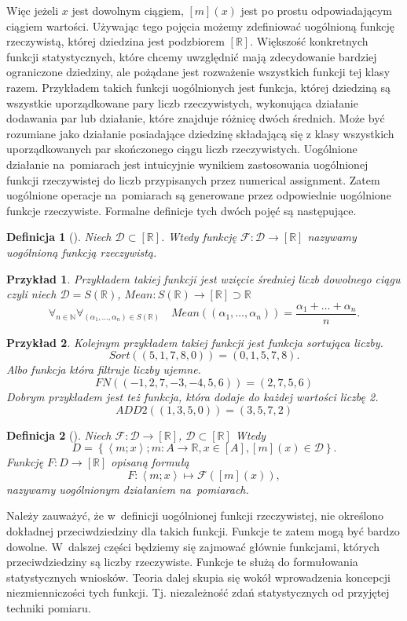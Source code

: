 \documentclass[12pt,a4paper]{report}
\newtheorem{definition}{Definicja}[chapter]
\newtheorem{przyklad}{Przykład}
\newcommand{\parauporzadkowana}[2]{\left\langle {#1}; {#2} \right\rangle}
\newcommand{\zbior}[1]{\left\lbrace {#1} \right\rbrace }
\newcommand{\domkniecie}[1]{\left[ {#1} \right] }
\begin{document}
Więc jeżeli $x$ jest dowolnym ciągiem, $\domkniecie{m}(x)$ jest po prostu odpowiadającym ciągiem wartości. Używając tego pojęcia możemy zdefiniować uogólnioną funkcję rzeczywistą, której dziedzina jest podzbiorem $\domkniecie{\mathbb{R}}$. Większość konkretnych funkcji statystycznych, które chcemy uwzględnić mają zdecydowanie bardziej ograniczone dziedziny, ale pożądane jest rozważenie wszystkich funkcji tej klasy razem. Przykładem takich funkcji uogólnionych jest funkcja, której dziedziną są wszystkie uporządkowane pary liczb rzeczywistych, wykonująca działanie dodawania par lub działanie, które znajduje różnicę dwóch średnich. Może być rozumiane jako działanie posiadające dziedzinę składającą się z klasy wszystkich uporządkowanych par skończonego ciągu liczb rzeczywistych. Uogólnione działanie na~pomiarach jest intuicyjnie wynikiem zastosowania uogólnionej funkcji rzeczywistej  do liczb przypisanych przez numerical assignment. Zatem uogólnione operacje na~pomiarach są generowane przez odpowiednie uogólnione funkcje rzeczywiste. Formalne definicje tych dwóch pojęć są następujące.
\begin{definition}[{\citep[Def. 4.1]{adams1965theory}}]
Niech $\mathcal{D}\subset \domkniecie{\mathbb{R}}$. Wtedy funkcję $\mathcal{F}:\mathcal{D}\to \domkniecie{\mathbb{R}}$ nazywamy uogólnioną funkcją rzeczywistą.
\end{definition}
\begin{przyklad}
Przykładem takiej funkcji jest wzięcie średniej  liczb dowolnego ciągu czyli niech $\mathcal{D}=S(\mathbb{R})$, $Mean: S(\mathbb{R})\to \domkniecie{\mathbb{R}}\supset \mathbb{R}$
$$
\forall_{n \in \mathbb{N}} \forall_{(\alpha_1,\dots,\alpha_n)\in S(\mathbb{R})} \quad Mean((\alpha_1,\dots,\alpha_n))=\frac{\alpha_1+\dots+\alpha_n}{n}.
$$
\end{przyklad}
\begin{przyklad}
Kolejnym przykładem takiej funkcji jest funkcja sortująca liczby.
$$
Sort((5,1,7,8,0))=(0,1,5,7,8).
$$
Albo funkcja która filtruje liczby ujemne.
$$
FN((-1,2,7,-3,-4,5,6))=(2,7,5,6)
$$
Dobrym przykładem jest też funkcja, która dodaje do każdej wartości liczbę 2.
$$
ADD2((1,3,5,0))=(3,5,7,2)
$$
\end{przyklad}
\begin{definition}[{\citep[Def. 4.2]{adams1965theory}}]
Niech $\mathcal{F}:\mathcal{D}\to \domkniecie{\mathbb{R}}$, $\mathcal{D}\subset\domkniecie{\mathbb{R}}$ Wtedy
$$
D=\zbior{\parauporzadkowana{m}{x}; m:A\to \mathbb{R}, x\in \domkniecie{A}, \domkniecie{m}(x)\in \mathcal{D}}.
$$
Funkcję $F:D\to\domkniecie{\mathbb{R}}$ opisaną formułą
$$
F:\parauporzadkowana{m}{x}\longmapsto\mathcal{F}(\domkniecie{m}(x)),
$$
nazywamy uogólnionym działaniem na~pomiarach.
\end{definition}
Należy zauważyć, że w~definicji uogólnionej funkcji rzeczywistej, nie określono dokładnej przeciwdziedziny dla takich funkcji. Funkcje te zatem mogą być bardzo dowolne. W~dalszej części będziemy się zajmować głównie funkcjami, których przeciwdziedziny są liczby rzeczywiste.  Funkcje te służą do formułowania statystycznych wniosków. Teoria dalej skupia się wokół wprowadzenia koncepcji niezmienniczości tych funkcji. Tj. niezależność zdań statystycznych od przyjętej techniki pomiaru.
\end{document}
